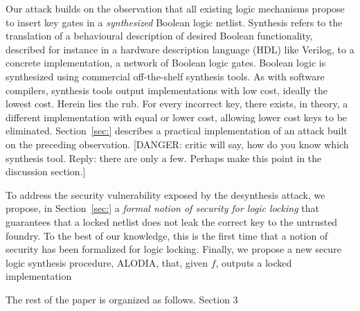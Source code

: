 Our attack builds on the observation that 
all existing 
logic mechanisms propose to insert key gates 
in a \emph{synthesized} 
Boolean logic netlist. 
Synthesis refers to 
the translation 
of a behavioural description of 
desired Boolean functionality, described for instance in 
a hardware description language (HDL) like Verilog, to a 
concrete implementation, a network 
of Boolean logic gates. Boolean logic is 
synthesized using 
commercial off-the-shelf synthesis tools. As with software 
compilers, synthesis tools output implementations with low 
cost, ideally the lowest cost. 
Herein lies the rub. For every incorrect key, 
there 
exists, in theory, a
different 
implementation with equal or lower cost, allowing 
lower cost keys to be eliminated. 
Section~\ref{sec:} describes a 
practical implementation of an attack built on the preceding 
observation. 
[DANGER: critic will say, how do you know which synthesis tool. 
Reply: there are only a few. Perhaps make this point in the 
discussion section.]


To address the security vulnerability exposed by the 
desynthesis attack,
we propose, in Section~\ref{sec:} 
a \emph{formal notion of security 
for logic locking} that 
guarantees that a locked netlist 
does not leak 
the correct key to the untrusted foundry.
To the 
best of our knowledge, this is the first time that 
a notion of security has been formalized for logic locking. 
Finally, we propose a new 
secure logic synthesis 
procedure, ALODIA,   
that, given $f$, outputs a 
locked implementation  










 
   





 
 






The rest of the paper is organized as follows. Section 3 
